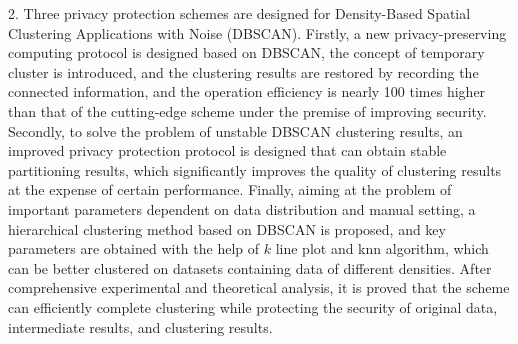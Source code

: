 \begin{eabstract}
2. Three privacy protection schemes are designed for Density-Based Spatial Clustering Applications with Noise (DBSCAN). Firstly, a new privacy-preserving computing protocol is designed based on DBSCAN, the concept of temporary cluster is introduced, and the clustering results are restored by recording the connected information, and the operation efficiency is nearly 100 times higher than that of the cutting-edge scheme under the premise of improving security. Secondly, to solve the problem of unstable DBSCAN clustering results, an improved privacy protection protocol is designed that can obtain stable partitioning results, which significantly improves the quality of clustering results at the expense of certain performance. Finally, aiming at the problem of important parameters dependent on data distribution and manual setting, a hierarchical clustering method based on DBSCAN is proposed, and key parameters are obtained with the help of $k$ line plot and knn algorithm, which can be better clustered on datasets containing data of different densities. After comprehensive experimental and theoretical analysis, it is proved that the scheme can efficiently complete clustering while protecting the security of original data, intermediate results, and clustering results.

\end{eabstract}
